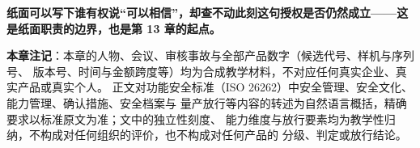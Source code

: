 \textbf{纸面可以写下谁有权说“可以相信”，却查不动此刻这句授权是否仍然成立——这是纸面职责的边界，也是第 13 章的起点。}


\begin{noteblock}
\textbf{本章注记}：本章的人物、会议、审核事故与全部产品数字（候选代号、样机与序列号、
版本号、时间与金额跨度等）均为合成教学材料，不对应任何真实企业、真实产品或真实个人。
正文对功能安全标准（ISO 26262）中安全管理、安全文化、能力管理、确认措施、安全档案与
量产放行等内容的转述为自然语言概括，精确要求以标准原文为准；文中的独立性刻度、
能力维度与放行要素均为教学性归纳，不构成对任何组织的评价，也不构成对任何产品的
分级、判定或放行结论。
\end{noteblock}
